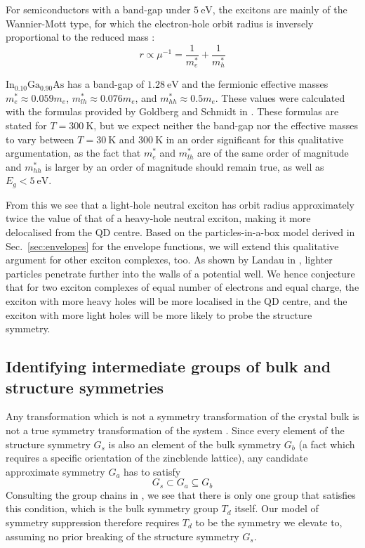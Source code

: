 For semiconductors with a band-gap under $\SI{5}{\electronvolt}$, the excitons are mainly of the Wannier-Mott type, for which the electron-hole orbit radius is inversely proportional to the reduced mass \cite[p.~78]{fox}:
\begin{equation}
r\propto \mu^{-1} = \frac{1}{m_e^*}+\frac{1}{m_h^*}
\end{equation}

$\text{In}_{0.10}\text{Ga}_{0.90}\text{As}$ has a band-gap of $\SI{1.28}{\electronvolt}$ and the fermionic effective masses $m^*_e\approx 0.059m_e$, $m^*_{lh}\approx 0.076m_e$, and $m^*_{hh}\approx 0.5m_e$. These values were calculated with the formulas provided by Goldberg and Schmidt in \cite[p.~62]{semiconductor_handbook}. These formulas are stated for $T=\SI{300}{\kelvin}$, but we expect neither the band-gap nor the effective masses to vary between $T=\SI{30}{\kelvin}$ and $\SI{300}{\kelvin}$ in an order significant for this qualitative argumentation, as the fact that $m_e^*$ and $m_{lh}^*$ are of the same order of magnitude and $m_{hh}^*$ is larger by an order of magnitude should remain true, as well as $E_g < \SI{5}{\electronvolt}$.

From this we see that a light-hole neutral exciton has orbit radius approximately twice the value of that of a heavy-hole neutral exciton, making it more delocalised from the QD centre. Based on the particles-in-a-box model derived in Sec.~\ref{sec:envelopes} for the envelope functions, we will extend this qualitative argument for other exciton complexes, too. As shown by Landau in \cite[p.~64]{landau}, lighter particles penetrate further into the walls of a potential well. We hence conjecture that for two exciton complexes of equal number of electrons and equal charge, the exciton with more heavy holes will be more localised in the QD centre, and the exciton with more light holes will be more likely to probe the structure symmetry.

\subsection{Identifying intermediate groups of bulk and structure symmetries}
Any transformation which is not a symmetry transformation of the crystal bulk is not a true symmetry transformation of the system \cite{bulk_limiting}. Since every element of the structure symmetry $G_s$ is also an element of the bulk symmetry $G_b$ (a fact which requires a specific orientation of the zincblende lattice), any candidate approximate symmetry $G_a$ has to satisfy
\begin{equation} \label{eq:group_chain}
G_s \subset G_a \subseteq G_b
\end{equation}
Consulting the group chains in \cite[Ch.~9]{altmann}, we see that there is only one group that satisfies this condition, which is the bulk symmetry group $T_d$ itself. Our model of symmetry suppression therefore requires $T_d$ to be the symmetry we elevate to, assuming no prior breaking of the structure symmetry $G_s$.

